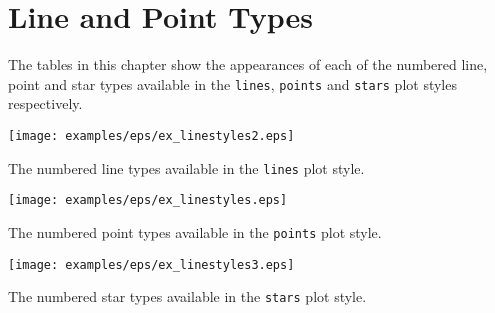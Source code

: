 %
%
%
%
%



\chapter{Line and Point Types}
\label{ch:linetypes_table}

The tables in this chapter show the appearances of each of the numbered line,
point and star types available in the {\tt lines}, {\tt points} and {\tt stars}
plot styles respectively.

\begin{table}
\begin{center}
\texttt{[image: examples/eps/ex\_linestyles2.eps]}
\end{center}
\caption{The numbered line types available in the {\tt lines} plot style.}
\end{table}

\begin{table}
\begin{center}
\texttt{[image: examples/eps/ex\_linestyles.eps]}
\end{center}
\caption{The numbered point types available in the {\tt points} plot style.}
\end{table}

\begin{table}
\begin{center}
\texttt{[image: examples/eps/ex\_linestyles3.eps]}
\end{center}
\caption{The numbered star types available in the {\tt stars} plot style.}
\end{table}

